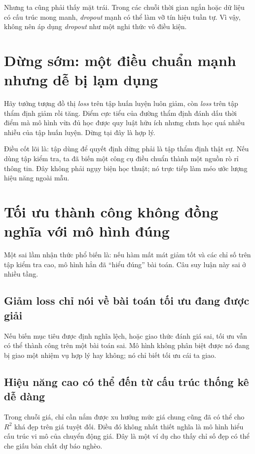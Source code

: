 Nhưng ta cũng phải thấy mặt trái. Trong các chuỗi thời gian ngắn hoặc dữ liệu có cấu trúc mong manh, \emph{dropout} mạnh có thể làm vỡ tín hiệu tuần tự. Vì vậy, không nên áp dụng \emph{dropout} như một nghi thức vô điều kiện.

\section{Dừng sớm: một điều chuẩn mạnh nhưng dễ bị lạm dụng}

Hãy tưởng tượng đồ thị \emph{loss} trên tập huấn luyện luôn giảm, còn \emph{loss} trên tập thẩm định giảm rồi tăng. Điểm cực tiểu của đường thẩm định đánh dấu thời điểm mà mô hình vừa đủ học được quy luật hữu ích nhưng chưa học quá nhiều nhiễu của tập huấn luyện. Dừng tại đây là hợp lý.

Điều cốt lõi là: tập dùng để quyết định dừng phải là tập thẩm định thật sự. Nếu dùng tập kiểm tra, ta đã biến một công cụ điều chuẩn thành một nguồn rò rỉ thông tin. Đây không phải ngụy biện học thuật; nó trực tiếp làm méo ước lượng hiệu năng ngoài mẫu.

\section{Tối ưu thành công không đồng nghĩa với mô hình đúng}

Một sai lầm nhận thức phổ biến là: nếu hàm mất mát giảm tốt và các chỉ số trên tập kiểm tra cao, mô hình hẳn đã ``hiểu đúng'' bài toán. Câu suy luận này sai ở nhiều tầng.

\subsection{Giảm loss chỉ nói về bài toán tối ưu đang được giải}

Nếu biến mục tiêu được định nghĩa lệch, hoặc giao thức đánh giá sai, tối ưu vẫn có thể thành công trên một bài toán sai. Mô hình không phân biệt được nó đang bị giao một nhiệm vụ hợp lý hay không; nó chỉ biết tối ưu cái ta giao.

\subsection{Hiệu năng cao có thể đến từ cấu trúc thống kê dễ dàng}

Trong chuỗi giá, chỉ cần nắm được xu hướng mức giá chung cũng đã có thể cho \(R^2\) khá đẹp trên giá tuyệt đối. Điều đó không nhất thiết nghĩa là mô hình hiểu cấu trúc vi mô của chuyển động giá. Đây là một ví dụ cho thấy chỉ số đẹp có thể che giấu bản chất dự báo nghèo.

